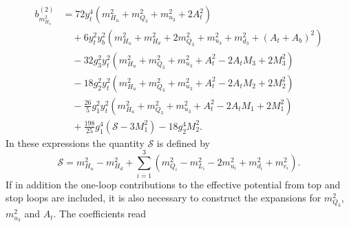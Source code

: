 \documentclass[preprint,amsmath,amssymb,aps,superscriptaddress,prd,showpacs,floatfix,nofootinbib]{revtex4-1}
\begin{document}
\begin{subequations}
\begin{align}
b_{m_{H_u}^2}^{(2)}&=72y_t^4\left ( m_{H_u}^2+m_{Q_3}^2+m_{u_3}^2+2A_t^2\right )\nonumber\\
&\quad{}+6y_t^2y_b^2\left ( m_{H_u}^2+m_{H_d}^2+2m_{Q_3}^2+m_{u_3}^2+m_{d_3}^2+(A_t+A_b)^2\right )\nonumber\\
&\quad{}-32g_3^2y_t^2\left ( m_{H_u}^2+m_{Q_3}^2+m_{u_3}^2+A_t^2-2A_tM_3+2M_3^2\right )\nonumber\\
&\quad{}-18g_2^2y_t^2\left ( m_{H_u}^2+m_{Q_3}^2+m_{u_3}^2+A_t^2-2A_tM_2+2M_2^2\right )\nonumber\\
&\quad{}-\frac{26}{5}g_1^2y_t^2\left ( m_{H_u}^2+m_{Q_3}^2+m_{u_3}^2+A_t^2-2A_tM_1+2M_1^2\right )\nonumber\\
&\quad{}+\frac{198}{25}g_1^4\left ( \mathcal{S}-3M_1^2\right )-18g_2^4M_2^2.\label{eq:MSSMmHu2b2}
\end{align}
\end{subequations}
In these expressions the quantity $\mathcal{S}$ is defined by
\begin{equation}\label{eq:MSSMgaugeBetaContribution}
\mathcal{S}=m_{H_u}^2-m_{H_d}^2+\sum_{i=1}^3\left ( m_{Q_i}^2-m_{L_i}^2-2m_{u_i}^2+m_{d_i}^2+m_{e_i}^2\right ).
\end{equation}
If in addition the one-loop contributions to the effective potential
from top and stop loops are included, it is also necessary to
construct the expansions for $m_{Q_3}^2$, $m_{u_3}^2$ and $A_t$. The
coefficients read
\end{document}
